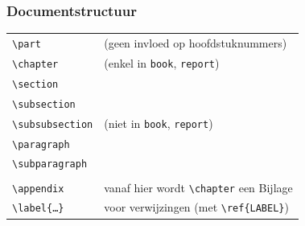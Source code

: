 \documentclass{beamer}
\begin{document}
\begin{frame}[fragile]
  \frametitle{Documentstructuur}
  
  \begin{center}
  \begin{tabular}{ll}
    \verb?\part? & (geen invloed op hoofdstuknummers) \\
    \verb?\chapter? & (enkel in \texttt{book}, \texttt{report}) \\
    \verb?\section? & \\
    \verb?\subsection? & \\
    \verb?\subsubsection? & (niet in \texttt{book}, \texttt{report}) \\ 
    \verb?\paragraph? & \\
    \verb?\subparagraph? & \\
    &\\
    \verb?\appendix? & vanaf hier wordt \verb?\chapter? een Bijlage \\
    \verb?\label{?\texttt{\ldots}\verb?}? & voor verwijzingen (met \verb|\ref{LABEL}|)
  \end{tabular}
  \end{center}
\end{frame}
\end{document}
